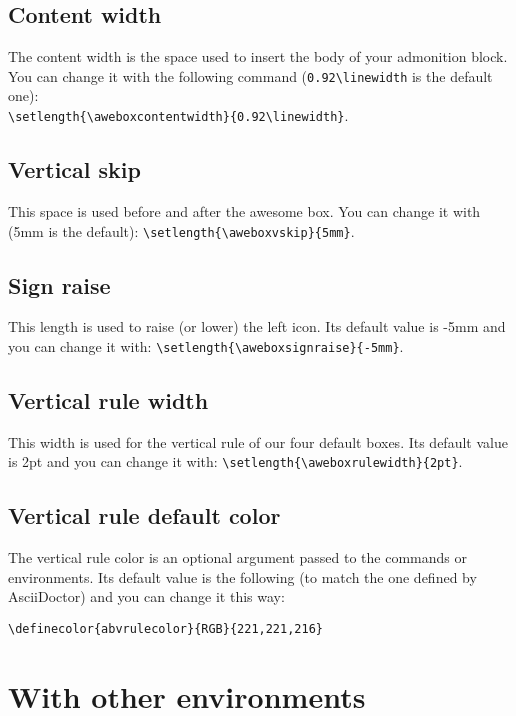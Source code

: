 \documentclass[a4paper,12pt]{article}
\begin{document}
\subsection{Content width}

The content width is the space used to insert the body of your
admonition block. You can change it with the following command
(\verb!0.92\linewidth! is the default one):\\
\verb!\setlength{\aweboxcontentwidth}{0.92\linewidth}!.

\subsection{Vertical skip}

This space is used before and after the awesome box. You can change it
with (5mm is the default): \verb!\setlength{\aweboxvskip}{5mm}!.

\subsection{Sign raise}

This length is used to raise (or lower) the left icon. Its default value
is -5mm and you can change it with:
\verb!\setlength{\aweboxsignraise}{-5mm}!.

\subsection{Vertical rule width}

This width is used for the vertical rule of our four default boxes. Its
default value is 2pt and you can change it with:
\verb!\setlength{\aweboxrulewidth}{2pt}!.

\subsection{Vertical rule default color}

The vertical rule color is an optional argument passed to the commands
or environments. Its default value is the following (to match the one
defined by AsciiDoctor) and you can change it this way:

\verb!\definecolor{abvrulecolor}{RGB}{221,221,216}!

\section{With other environments}
\end{document}
